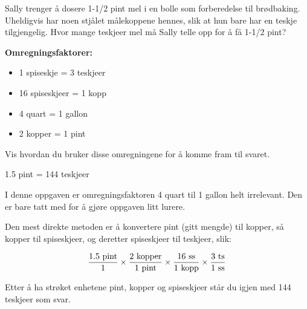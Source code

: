 
Sally trenger å dosere 1-1/2 pint mel i en bolle som forberedelse til brødbaking. Uheldigvis har noen stjålet målekoppene hennes, slik at hun bare har en teskje tilgjengelig. Hvor mange teskjeer mel må Sally telle opp for å få 1-1/2 pint?

\vskip 10pt

\noindent
{\bf Omregningsfaktorer:}

\begin{itemize}
\item{} 1 spiseskje = 3 teskjeer
\item{} 16 spiseskjeer = 1 kopp
\item{} 4 quart = 1 gallon
\item{} 2 kopper = 1 pint
\end{itemize}

Vis hvordan du bruker disse omregningene for å komme fram til svaret.







1.5 pint = 144 teskjeer

\vskip 10pt

I denne oppgaven er omregningsfaktoren 4 quart til 1 gallon helt irrelevant. Den er bare tatt med for å gjøre oppgaven litt lurere.

Den mest direkte metoden er å konvertere pint (gitt mengde) til kopper, så kopper til spiseskjeer, og deretter spiseskjeer til teskjeer, slik:

$${{1.5 \hbox{ pint}} \over {1}} \times {{2 \hbox{ kopper}} \over {1 \hbox{ pint}}} \times {{16 \hbox{ ss}} \over {1 \hbox{ kopp}}} \times {{3 \hbox{ ts}} \over {1 \hbox{ ss}}}$$

Etter å ha strøket enhetene pint, kopper og spiseskjeer står du igjen med 144 teskjeer som svar.










